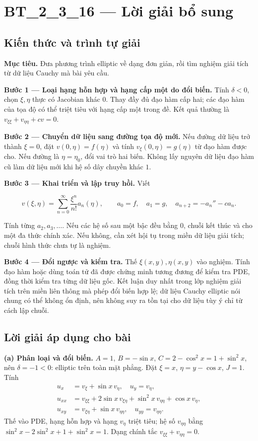 \documentclass[10pt,a4paper]{article}
\begin{document}
\section*{BT\_2\_3\_16 — Lời giải bổ sung}
\subsection*{Kiến thức và trình tự giải}
\textbf{Mục tiêu.} Đưa phương trình elliptic về dạng đơn giản, rồi tìm nghiệm giải tích từ dữ liệu Cauchy mà bài yêu cầu.

\textbf{Bước 1 — Loại hạng hỗn hợp và hạng cấp một do đổi biến.} Tính $\delta<0$, chọn $\xi,\eta$ thực có Jacobian khác $0$. Thay đầy đủ đạo hàm cấp hai; các đạo hàm của tọa độ có thể triệt tiêu với hạng cấp một trong đề. Kết quả thường là $v_{\xi\xi}+v_{\eta\eta}+c v=0$.

\textbf{Bước 2 — Chuyển dữ liệu sang đường tọa độ mới.} Nếu đường dữ liệu trở thành $\xi=0$, đặt $v(0,\eta)=f(\eta)$ và tính $v_\xi(0,\eta)=g(\eta)$ từ đạo hàm được cho. Nếu đường là $\eta=\eta_0$, đổi vai trò hai biến. Không lấy nguyên dữ liệu đạo hàm cũ làm dữ liệu mới khi hệ số dây chuyền khác $1$.

\textbf{Bước 3 — Khai triển và lập truy hồi.} Viết


\[
v(\xi,\eta)=\sum_{n=0}^{\infty}\frac{\xi^n}{n!}a_n(\eta),\qquad
a_0=f,\quad a_1=g,\quad a_{n+2}=-a_n''-c a_n.
\]


Tính từng $a_2,a_3,\ldots$. Nếu các hệ số sau một bậc đều bằng $0$, chuỗi kết thúc và cho một đa thức chính xác. Nếu không, cần xét hội tụ trong miền dữ liệu giải tích; chuỗi hình thức chưa tự là nghiệm.

\textbf{Bước 4 — Đổi ngược và kiểm tra.} Thế $\xi(x,y),\eta(x,y)$ vào nghiệm. Tính đạo hàm hoặc dùng toán tử đã được chứng minh tương đương để kiểm tra PDE, đồng thời kiểm tra từng dữ liệu gốc. Kết luận duy nhất trong lớp nghiệm giải tích trên miền liên thông mà phép đổi biến hợp lệ; dữ liệu Cauchy elliptic nói chung có thể không ổn định, nên không suy ra tồn tại cho dữ liệu tùy ý chỉ từ cách lập chuỗi.
\subsection*{Lời giải áp dụng cho bài}
\textbf{(a) Phân loại và đổi biến.} $A=1$, $B=-\sin x$, $C=2-\cos^2x=1+\sin^2x$, nên $\delta=-1<0$: elliptic trên toàn mặt phẳng. Đặt $\xi=x$, $\eta=y-\cos x$, $J=1$. Tính
\begin{align*}
u_x&=v_\xi+\sin x\,v_\eta,\quad u_y=v_\eta,\\
u_{xx}&=v_{\xi\xi}+2\sin x\,v_{\xi\eta}+\sin^2x\,v_{\eta\eta}+\cos x\,v_\eta,\\
u_{xy}&=v_{\xi\eta}+\sin x\,v_{\eta\eta},\quad u_{yy}=v_{\eta\eta}.
\end{align*}
Thế vào PDE, hạng hỗn hợp và hạng $v_\eta$ triệt tiêu; hệ số $v_{\eta\eta}$ bằng $\sin^2x-2\sin^2x+1+\sin^2x=1$. Dạng chính tắc $v_{\xi\xi}+v_{\eta\eta}=0$.
\end{document}
